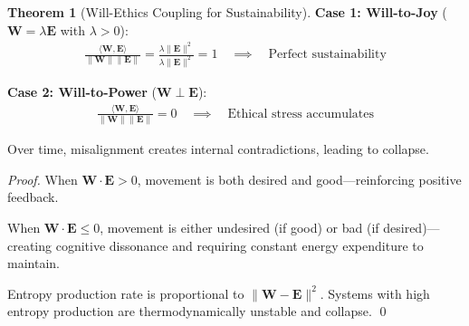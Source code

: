 \documentclass[11pt,a4paper]{article}
\theoremstyle{definition}
\newtheorem{theorem}{Theorem}[section]
\theoremstyle{remark}
\newcommand{\EE}{\mathbf{E}}
\newcommand{\WW}{\mathbf{W}}
\begin{document}
\begin{small}
\begin{enumerate}
\begin{theorem}[Will-Ethics Coupling for Sustainability]
\textbf{Case 1: Will-to-Joy} (\(\WW = \lambda \EE\) with \(\lambda > 0\)):
\begin{align}
\frac{\langle \WW, \EE \rangle}{\|\WW\| \|\EE\|} = \frac{\lambda \|\EE\|^2}{\lambda \|\EE\|^2} = 1 \quad \implies \quad \text{Perfect sustainability}
\end{align}

\textbf{Case 2: Will-to-Power} (\(\WW \perp \EE\)):
\begin{align}
\frac{\langle \WW, \EE \rangle}{\|\WW\| \|\EE\|} = 0 \quad \implies \quad \text{Ethical stress accumulates}
\end{align}

Over time, misalignment creates internal contradictions, leading to collapse.
\end{theorem}

\begin{proof}
When \(\WW \cdot \EE > 0\), movement is both desired and good—reinforcing positive feedback.

When \(\WW \cdot \EE \leq 0\), movement is either undesired (if good) or bad (if desired)—creating cognitive dissonance and requiring constant energy expenditure to maintain.

Entropy production rate is proportional to \(\|\WW - \EE\|^2\). Systems with high entropy production are thermodynamically unstable and collapse. \qed
\end{proof}

\begin{figure}[H]
\centering
{}
\end{figure}
\end{enumerate}
\end{small}
\end{document}
